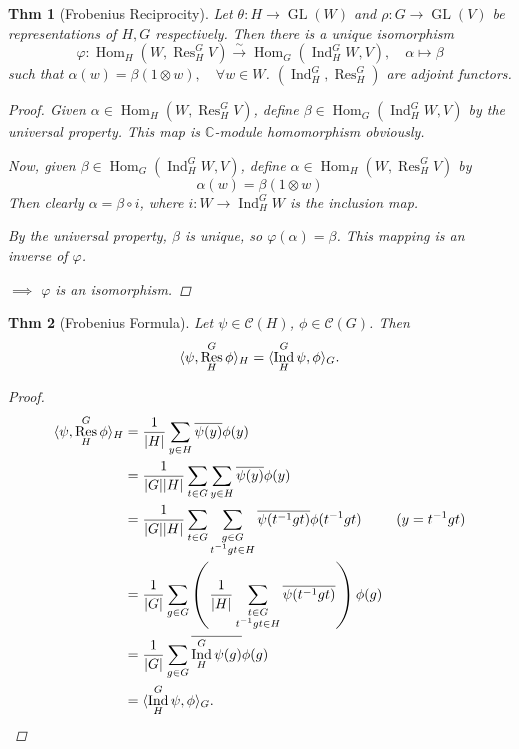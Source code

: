 \documentclass[a4paper]{article}
\DeclarePairedDelimiter{\abs}{\lvert}{\rvert}
\DeclarePairedDelimiter{\inpd}{\langle}{\rangle} %
\newcommand*{\Cb}{\mathbb{C}}
\newcommand*{\Cc}{\mathcal{C}}
\DeclareMathOperator{\Res}{Res}
\DeclareMathOperator{\Ind}{Ind}
\newcommand*\GL[1]{\operatorname{GL}\mathopen{}\left({#1}\right)\mathclose{}}
\DeclareMathOperator{\Hom}{Hom}
\newcommand*{\ob}{\overline}
\newcommand*\isoto{\xrightarrow{\sim}}
\theoremstyle{mystyle}
\newtheorem{theorem}{Thm}
\begin{document}
\begin{theorem}[Frobenius Reciprocity]
  \label{thm:frob}
  Let $\theta: H\to \GL{W}$ and $\rho: G\to \GL{V}$ be representations of
  $H, G$ respectively. Then there is a unique isomorphism
  \[
    \varphi: \Hom_H(W, \Res^G_H V) \isoto \Hom_G(\Ind^G_H W, V), \quad
    \alpha \mapsto \beta
  \]
  such that $\alpha(w) = \beta(1 \otimes w), \quad \forall w \in W$.
  $(\Ind^G_H, \Res^G_H)$ are adjoint functors.
  \begin{proof}
    Given $\alpha \in \Hom_H(W, \Res^G_H V)$, define
    $\beta \in \Hom_G(\Ind^G_H W, V)$ by the universal property.
    This map is $\Cb$-module homomorphism obviously.

    Now, given $\beta \in \Hom_G(\Ind^G_H W, V)$, define
    $\alpha \in \Hom_H(W, \Res^G_H V)$ by
    \[
      \alpha(w) = \beta(1\otimes w)
    \]
    Then clearly $\alpha = \beta \circ i$, where $i: W\to \Ind^G_H W$ is the
    inclusion map.

    By the universal property, $\beta$ is unique, so $\varphi(\alpha) = \beta$.
    This mapping is an inverse of $\varphi$.
    
    $\implies$ $\varphi$ is an isomorphism.
  \end{proof}
\end{theorem}

\begin{theorem}[Frobenius Formula]
  Let $\psi \in \Cc(H)$, $\phi \in \Cc(G)$. Then
  \[
    \inpd{\psi,\Res^G_H \phi}_H = \inpd{\Ind^G_H \psi,\phi}_G.
  \]
  \begin{proof}
    \begin{align*}
      \inpd{\psi,\Res^G_H \phi}_H
      &= \frac{1}{\abs{H}} \sum_{y \in H} \ob{\psi(y)} \phi(y) \\
      &= \frac{1}{\abs{G}\abs{H}} \sum_{t \in G} \sum_{y \in H} \ob{\psi(y)} \phi(y) \\
      &= \frac{1}{\abs{G}\abs{H}} \sum_{t \in G}
        \sum_{\substack{g\in G\\ t^{-1}gt \in H}} \ob{\psi(t^{-1}gt)} \phi(t^{-1}gt)
        & (y = t^{-1}gt) \\
      &= \frac{1}{\abs{G}} \sum_{g\in G} \left( \frac{1}{\abs{H}}
        \sum_{\substack{t\in G\\ t^{-1}gt \in H}} \ob{\psi(t^{-1}gt)} \right) \phi(g) \\
      &= \frac{1}{\abs{G}} \sum_{g\in G} \ob{\Ind^G_H \psi(g)} \phi(g) \\
      &= \inpd{\Ind^G_H \psi,\phi}_G.
    \end{align*}
  \end{proof}
\end{theorem}
\end{document}
